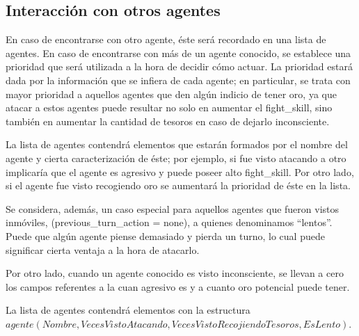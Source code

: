 \documentclass[a4paper,10pt,spanish]{article}
\begin{document}
	\subsection{Interacci\'on con otros agentes}
	
	En caso de encontrarse con otro agente, \'este ser\'a recordado en una lista de agentes. En caso de encontrarse con m\'as de un agente conocido, se establece una prioridad que ser\'a utilizada a la hora de decidir c\'omo actuar. La prioridad estar\'a dada por la informaci\'on que se infiera de cada agente; en particular, se trata con mayor prioridad a aquellos agentes que den alg\'un indicio de tener oro, ya que atacar a estos agentes puede resultar no solo en aumentar el fight\_skill, sino tambi\'en en aumentar la cantidad de tesoros en caso de dejarlo inconsciente.
	
	La lista de agentes contendr\'a elementos que estar\'an formados por el nombre del agente y cierta caracterizaci\'on de \'este; por ejemplo, si fue visto atacando a otro implicar\'ia que el agente es agresivo y puede poseer alto fight\_skill. Por otro lado, si el agente fue visto recogiendo oro se aumentar\'a la prioridad de \'este en la lista. 
	
	Se considera, adem\'as, un caso especial para aquellos agentes que fueron vistos inm\'oviles, (previous\_turn\_action = none), a quienes denominamos ``lentos''. Puede que alg\'un agente piense demasiado y pierda un turno, lo cual puede significar cierta ventaja a la hora de atacarlo.
	
	Por otro lado, cuando un agente conocido es visto inconsciente, se llevan a cero los campos referentes a la cuan agresivo es y a cuanto oro potencial puede tener.
	
	La lista de agentes contendr\'a elementos con la estructura \\
	$agente(Nombre, VecesVistoAtacando, VecesVistoRecojiendoTesoros, EsLento)$.
	
% 	
	
\end{document}
